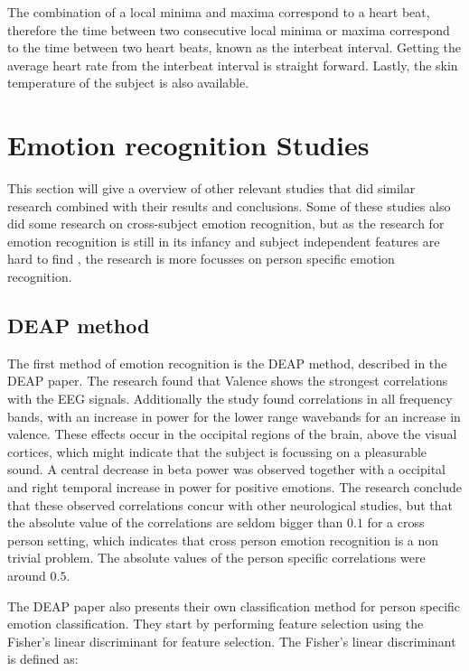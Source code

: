 
\npar

The combination of a local minima and maxima correspond to a heart beat, therefore the time between two consecutive local minima or maxima correspond to the time between two heart beats, known as the interbeat interval. Getting the average heart rate from the interbeat interval is straight forward. Lastly, the skin temperature of the subject is also available.

\section{Emotion recognition Studies}
This section will give a overview of other relevant studies that did similar research combined with their results and conclusions. Some of these studies also did some research on cross-subject emotion recognition, but as the research for emotion recognition is still in its infancy\citep{emorecoghard} and subject independent features are hard to find \citep{DEAP}, the research is more focusses on person specific emotion recognition.

\subsection{DEAP method}
The first method of emotion recognition is the DEAP method, described in the DEAP paper\citep{DEAP}. The research found that Valence shows the strongest correlations with the EEG signals. Additionally the study found correlations in all frequency bands, with an increase in power for the lower range wavebands for an increase in valence. These effects occur in the occipital regions of the brain, above the visual cortices, which might indicate that the subject is focussing on a pleasurable sound. A central decrease in beta power was observed together with a occipital and right temporal increase in power for positive emotions. The research conclude that these observed correlations concur with other neurological studies, but that the absolute value of the correlations are seldom bigger than $0.1$ for a cross person setting, which indicates that cross person emotion recognition is a non trivial problem. The absolute values of the person specific correlations were around $0.5$.

\npar

The DEAP paper also presents their own classification method for person specific emotion classification. They start by performing feature selection using the Fisher's linear discriminant for feature selection. The Fisher's linear discriminant is defined as:

